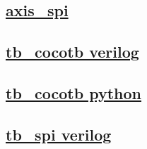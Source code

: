\documentclass{article}
\begin{document}
  


  \subsection{\href{../files/axis_spi-v.html}{axis\_spi}}

  \subsection{\href{../files2/tb_cocotb-v.html}{tb\_cocotb verilog}}

  \subsection{\href{../files2/tb_cocotb-py.html}{tb\_cocotb python}}

  \subsection{\href{../files2/tb_spi-v.html}{tb\_spi verilog}}
\end{document}
